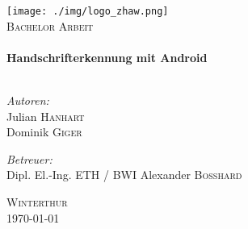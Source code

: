 \begin{titlepage}
 
\begin{center}
 
 
\texttt{[image: ./img/logo\_zhaw.png]}\\[2cm]
 

 
\textsc{\Large Bachelor Arbeit}\\[0.5cm]
 
 
\HRule \\[0.4cm]
{ \huge \bfseries Handschrifterkennung mit Android}\\[0.4cm]
 
\HRule \\[1.5cm]
 
\begin{minipage}{0.4\textwidth}
\begin{flushleft} \large
\emph{Autoren:}\\
Julian \textsc{Hanhart}\\
Dominik \textsc{Giger}
\end{flushleft}
\end{minipage}
\begin{minipage}{0.4\textwidth}
\begin{flushright} \large
\emph{Betreuer:} \\ 
Dipl. El.-Ing. ETH / BWI Alexander \textsc{Bosshard}\\
 
\end{flushright}
\end{minipage}
 
\vfill
 
\textsc{Winterthur}\\
{\large \today}
 
\end{center}
 
\end{titlepage}
